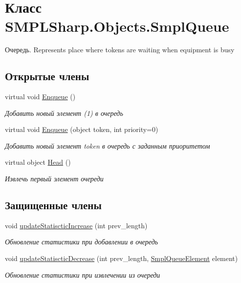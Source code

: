 \hypertarget{class_s_m_p_l_sharp_1_1_objects_1_1_smpl_queue}{\section{Класс S\-M\-P\-L\-Sharp.\-Objects.\-Smpl\-Queue}
\label{d3/ded/class_s_m_p_l_sharp_1_1_objects_1_1_smpl_queue}
}


Очередь. Represents place where tokens are waiting when equipment is busy  


\subsection*{Открытые члены}
\begin{DoxyCompactItemize}
\item 
virtual void \hyperlink{class_s_m_p_l_sharp_1_1_objects_1_1_smpl_queue_ab86ec6d2ecebdd085ec143f42ca9e480}{Enqueue} ()
\begin{DoxyCompactList}\small\item\em Добавить новый элемент (1) в очередь \end{DoxyCompactList}\item 
virtual void \hyperlink{class_s_m_p_l_sharp_1_1_objects_1_1_smpl_queue_a04a64c0b084018a7cd8663a92b88ca7c}{Enqueue} (object token, int priority=0)
\begin{DoxyCompactList}\small\item\em Добавить новый элемент token в очередь с заданным приоритетом \end{DoxyCompactList}\item 
virtual object \hyperlink{class_s_m_p_l_sharp_1_1_objects_1_1_smpl_queue_a92ab87b29c3b89fc549aa1142d3deeeb}{Head} ()
\begin{DoxyCompactList}\small\item\em Извлечь первый элемент очереди \end{DoxyCompactList}\end{DoxyCompactItemize}
\subsection*{Защищенные члены}
\begin{DoxyCompactItemize}
\item 
void \hyperlink{class_s_m_p_l_sharp_1_1_objects_1_1_smpl_queue_ae263ed3919f391ee553381f87bc261af}{update\-Statisctic\-Increase} (int prev\-\_\-length)
\begin{DoxyCompactList}\small\item\em Обновление статистики при добавлении в очередь \end{DoxyCompactList}\item 
void \hyperlink{class_s_m_p_l_sharp_1_1_objects_1_1_smpl_queue_ae9b81ec8414f245f3fa5d1fd00283984}{update\-Statisctic\-Decrease} (int prev\-\_\-length, \hyperlink{class_s_m_p_l_sharp_1_1_objects_1_1_smpl_queue_element}{Smpl\-Queue\-Element} element)
\begin{DoxyCompactList}\small\item\em Обновление статистики при извлечении из очереди \end{DoxyCompactList}\end{DoxyCompactItemize}
